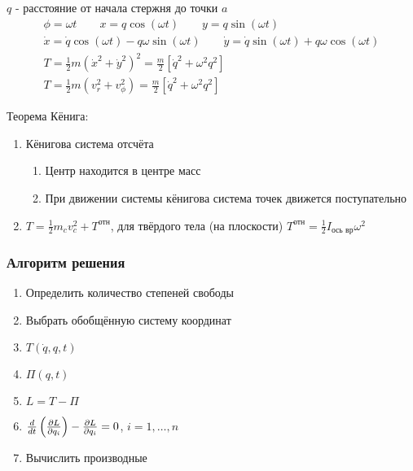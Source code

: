\documentclass{article}
\begin{document}
\begin{eg}
  \phantom{.}

  $q$ - расстояние от начала стержня до точки $a$
  \begin{gather*}
    \phi=\omega t \qquad x=q\cos(\omega t) \qquad y=q\sin(\omega t) \\ 
    \dot{x}=\dot{q}\cos(\omega t) - q \omega \sin(\omega t) \qquad
    \dot{y}=\dot{q}\sin(\omega t) + q \omega \cos(\omega t) \\ 
    T=\frac{1}{2}m(\dot{x}^{2}+\dot{y}^{2})^{2}=\frac{m}{2}[\dot{q}^{2}+\omega^{2}q^{2}] \\ 
    T=\frac{1}{2}m(v_r^{2}+v_{\phi}^{2})=\frac{m}{2}[\dot{q}^{2}+\omega^{2}q^{2}]
  \end{gather*}
\end{eg}
\begin{eg}
  \phantom{.}

  Теорема Кёнига:
  \begin{enumerate}
    \item Кёнигова система отсчёта
    \begin{enumerate}
      \item Центр находится в центре масс
      \item При движении системы кёнигова система точек движется поступательно
    \end{enumerate}
  \item $T=\frac{1}{2}m_cv_c^2+T^{\text{отн}}$, 
    для твёрдого тела (на плоскости) $T^{\text{отн}}=\frac{1}{2}I_{\text{ось вр}}\omega^{2}$
  \end{enumerate}
\end{eg}


\subsubsection{Алгоритм решения}
\begin{enumerate}
  \item Определить количество степеней свободы
  \item Выбрать обобщённую систему координат
  \item $T(\dot{q},q,t)$
  \item $\Pi(q,t)$
  \item $L=T-\Pi$
  \item $\frac{d}{dt}\left(\frac{\partial{L}}{\partial{q_i}}\right)-\frac{\partial{L}}{\partial{q_i}}=0$, $i=1,\dots ,n$
  \item Вычислить производные
\end{enumerate}
\end{document}
